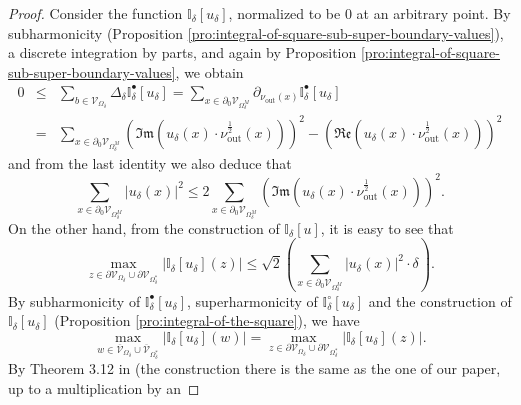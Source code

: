 \documentclass[oneside,english]{amsart}
\numberwithin{equation}{section}
\numberwithin{figure}{section}
\theoremstyle{plain}
\theoremstyle{plain}
\theoremstyle{plain}
\theoremstyle{plain}
\theoremstyle{plain}
\theoremstyle{definition}
\theoremstyle{remark}
\begin{document}
\begin{proof}
Consider the function $\mathbb{I}_{\delta}\left[u_{\delta}\right]$,
normalized to be $0$ at an arbitrary point. By subharmonicity (Proposition
\ref{pro:integral-of-square-sub-super-boundary-values}), a discrete
integration by parts, and again by Proposition \ref{pro:integral-of-square-sub-super-boundary-values},
we obtain
\begin{eqnarray*}
0 & \leq & \sum_{b\in\mathcal{V}_{\Omega_{\delta}}}\Delta_{\delta}\mathbb{I}_{\delta}^{\bullet}\left[u_{\delta}\right]=\sum_{x\in\partial_{0}\mathcal{V}_{\Omega_{\delta}^{M}}}\partial_{\nu_{\mathrm{out}}\left(x\right)}\mathbb{I}_{\delta}^{\bullet}\left[u_{\delta}\right]\\
 & = & \sum_{x\in\partial_{0}\mathcal{V}_{\Omega_{\delta}^{M}}}\left(\Im\mathfrak{m}\left(u_{\delta}\left(x\right)\cdot\nu_{\mathrm{out}}^{\frac{1}{2}}\left(x\right)\right)\right)^{2}-\left(\Re\mathfrak{e}\left(u_{\delta}\left(x\right)\cdot\nu_{\mathrm{out}}^{\frac{1}{2}}\left(x\right)\right)\right)^{2}
\end{eqnarray*}
and from the last identity we also deduce that
\[
\sum_{x\in\partial_{0}\mathcal{V}_{\Omega_{\delta}^{M}}}\left|u_{\delta}\left(x\right)\right|^{2}\leq2\sum_{x\in\partial_{0}\mathcal{V}_{\Omega_{\delta}^{M}}}\left(\Im\mathfrak{m}\left(u_{\delta}\left(x\right)\cdot\nu_{\mathrm{out}}^{\frac{1}{2}}\left(x\right)\right)\right)^{2}.
\]
On the other hand, from the construction of $\mathbb{I}_{\delta}\left[u\right]$,
it is easy to see that 
\[
\max_{z\in\partial\mathcal{V}_{\Omega_{\delta}}\cup\partial\mathcal{V}_{\Omega_{\delta}^{*}}}\left|\mathbb{I}_{\delta}\left[u_{\delta}\right]\left(z\right)\right|\leq\sqrt{2}\left(\sum_{x\in\partial_{0}\mathcal{V}_{\Omega_{\delta}^{M}}}\left|u_{\delta}\left(x\right)\right|^{2}\cdot\delta\right).
\]
By subharmonicity of $\mathbb{I}_{\delta}^{\bullet}\left[u_{\delta}\right]$,
superharmonicity of $\mathbb{I}_{\delta}^{\circ}\left[u_{\delta}\right]$
and the construction of $\mathbb{I}_{\delta}\left[u_{\delta}\right]$
(Proposition \ref{pro:integral-of-the-square}), we have
\[
\max_{w\in\overline{\mathcal{V}}_{\Omega_{\delta}}\cup\overline{\mathcal{V}}_{\Omega_{\delta}^{*}}}\left|\mathbb{I}_{\delta}\left[u_{\delta}\right]\left(w\right)\right|=\max_{z\in\partial\mathcal{V}_{\Omega_{\delta}}\cup\partial\mathcal{V}_{\Omega_{\delta}^{*}}}\left|\mathbb{I}_{\delta}\left[u_{\delta}\right]\left(z\right)\right|.
\]
By Theorem 3.12 in \cite{chelkak-smirnov-ii} (the construction there
is the same as the one of our paper, up to a multiplication by an

\end{proof}
\end{document}
